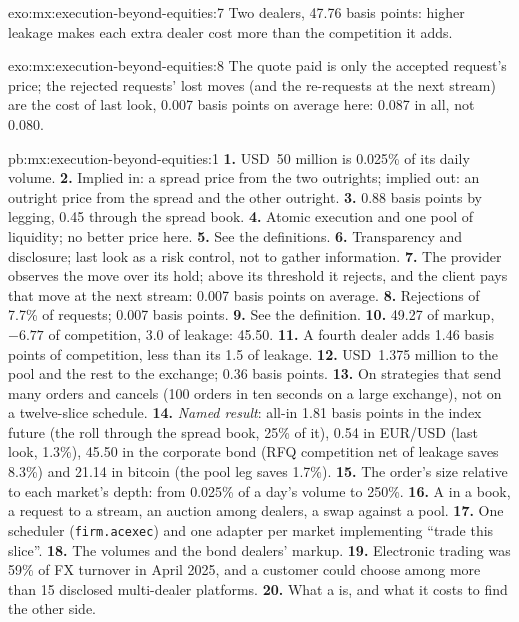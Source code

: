 \begin{solution}{exo:mx:execution-beyond-equities:7}
Two dealers, 47.76 basis points: higher leakage makes each extra dealer cost more than the competition it adds.
\end{solution}

\begin{solution}{exo:mx:execution-beyond-equities:8}
The quote paid is only the accepted request's price; the rejected requests' lost moves (and the re-requests at the next stream) are the cost of last
look, 0.007 basis points on average here: 0.087 in all, not 0.080.
\end{solution}

\begin{solution}{pb:mx:execution-beyond-equities:1}
\textbf{1.} USD~50 million is 0.025\% of its daily volume.
\textbf{2.} Implied in: a spread price from the two outrights; implied out: an outright price from the spread and the other outright.
\textbf{3.} 0.88 basis points by legging, 0.45 through the spread book.
\textbf{4.} Atomic execution and one pool of liquidity; no better price here.
\textbf{5.} See the definitions.
\textbf{6.} Transparency and disclosure; last look as a risk control, not to gather information.
\textbf{7.} The provider observes the move over its hold; above its threshold it rejects, and the client pays that move at the next stream: 0.007
basis points on average.
\textbf{8.} Rejections of 7.7\% of requests; 0.007 basis points.
\textbf{9.} See the definition.
\textbf{10.} 49.27 of markup, $-6.77$ of competition, 3.0 of leakage: 45.50.
\textbf{11.} A fourth dealer adds 1.46 basis points of competition, less than its 1.5 of leakage.
\textbf{12.} USD~1.375 million to the pool and the rest to the exchange; 0.36 basis points.
\textbf{13.} On strategies that send many orders and cancels (100 orders in ten seconds on a large exchange), not on a twelve-slice schedule.
\textbf{14.} \emph{Named result}: all-in 1.81 basis points in the index future (the roll through the spread book, 25\% of it), 0.54 in EUR/USD (last look,
1.3\%), 45.50 in the corporate bond (RFQ competition net of leakage saves 8.3\%) and 21.14 in bitcoin (the pool leg saves 1.7\%).
\textbf{15.} The order's size relative to each market's depth: from 0.025\% of a day's volume to 250\%.
\textbf{16.} A  in a book, a request to a stream, an auction among dealers, a swap against a pool.
\textbf{17.} One scheduler (\texttt{firm.acexec}) and one adapter per market implementing ``trade this slice''.
\textbf{18.} The volumes and the bond dealers' markup.
\textbf{19.} Electronic trading was 59\% of FX turnover in April 2025, and a customer could choose among more than 15 disclosed multi-dealer platforms.
\textbf{20.} What a  is, and what it costs to find the other side.
\end{solution}

